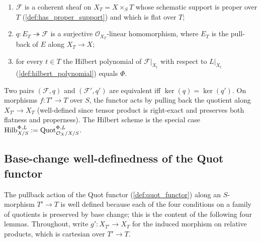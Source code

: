 \begin{definition}
  \begin{enumerate}
    \item \(\mathcal{F}\) is a coherent sheaf on \(X_T = X \times_S T\) whose
      schematic support is proper over \(T\) (\cref{def:has_proper_support}) and
      which is flat over \(T\);
    \item \(q : E_T \twoheadrightarrow \mathcal{F}\) is a surjective
      \(\mathcal{O}_{X_T}\)-linear homomorphism, where \(E_T\) is the pull-back
      of \(E\) along \(X_T \to X\);
    \item for every \(t \in T\) the Hilbert polynomial of \(\mathcal{F}|_{X_t}\)
      with respect to \(L|_{X_t}\) (\cref{def:hilbert_polynomial}) equals
      \(\Phi\).
  \end{enumerate}
  Two pairs \((\mathcal{F}, q)\) and \((\mathcal{F}', q')\) are equivalent iff
  \(\ker(q) = \ker(q')\). On morphisms \(f : T' \to T\) over \(S\), the functor
  acts by pulling back the quotient along \(X_{T'} \to X_T\) (well-defined
  since tensor product is right-exact and preserves both flatness and
  properness). The Hilbert scheme is the special case
  \(\operatorname{Hilb}^{\Phi,L}_{X/S} := \operatorname{Quot}^{\Phi,L}_{\mathcal{O}_X/X/S}\).
\end{definition}

\subsection{Base-change well-definedness of the Quot functor}
\label{sec:quot_base_change}

The pullback action of the Quot functor (\cref{def:quot_functor}) along an
\(S\)-morphism \(T' \to T\) is well defined because each of the four
conditions on a family of quotients is preserved by base change; this is the
content of the following four lemmas.  Throughout, write
\(g' : X_{T'} \to X_T\) for the induced morphism on relative products, which
is cartesian over \(T' \to T\).

